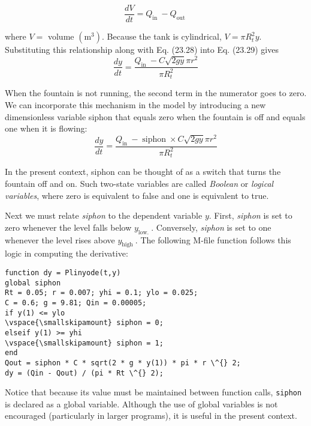 \documentclass[../main.tex]{subfiles}
\begin{document}
\begin{equation}
    \tag{23.29}
    \frac{d V}{d t}=Q_{\text {in }}-Q_{\text {out }}
\end{equation}

\noindent where $V=$ volume $\left(\mathrm{m}^{3}\right)$. Because the tank is cylindrical, $V=\pi R_{t}^{2} y$. Substituting this relationship along with Eq. (23.28) into Eq. (23.29) gives
\begin{equation}
    \tag{23.30}
    \frac{d y}{d t}=\frac{Q_{\text {in }}-C \sqrt{2 g y} \pi r^{2}}{\pi R_{t}^{2}}
\end{equation}

When the fountain is not running, the second term in the numerator goes to zero. We can incorporate this mechanism in the model by introducing a new dimensionless variable siphon that equals zero when the fountain is off and equals one when it is flowing:
\begin{equation}
    \tag{23.31}
    \frac{d y}{d t}=\frac{Q_{\text {in }}-\operatorname{siphon} \times C \sqrt{2 g y} \pi r^{2}}{\pi R_{t}^{2}}
\end{equation}

\noindent In the present context, siphon can be thought of as a switch that turns the fountain off and on. Such two-state variables are called \textit{Boolean} or \textit{logical variables}, where zero is equivalent to false and one is equivalent to true.

Next we must relate \textit{siphon} to the dependent variable $y$. First, \textit{siphon} is set to zero whenever the level falls below $y_{\text {low. }}$. Conversely, \textit{siphon} is set to one whenever the level rises above $y_{\text {high }}$. The following M-file function follows this logic in computing the derivative:

\begin{lstlisting}
function dy = Plinyode(t,y)
global siphon
Rt = 0.05; r = 0.007; yhi = 0.1; ylo = 0.025;
C = 0.6; g = 9.81; Qin = 0.00005;
if y(1) <= ylo
\vspace{\smallskipamount} siphon = 0;
elseif y(1) >= yhi
\vspace{\smallskipamount} siphon = 1;
end
Qout = siphon * C * sqrt(2 * g * y(1)) * pi * r \^{} 2;
dy = (Qin - Qout) / (pi * Rt \^{} 2);
\end{lstlisting}


\noindent Notice that because its value must be maintained between function calls, \texttt{siphon} is declared as a global variable. Although the use of global variables is not encouraged (particularly in larger programs), it is useful in the present context.
\end{document}
